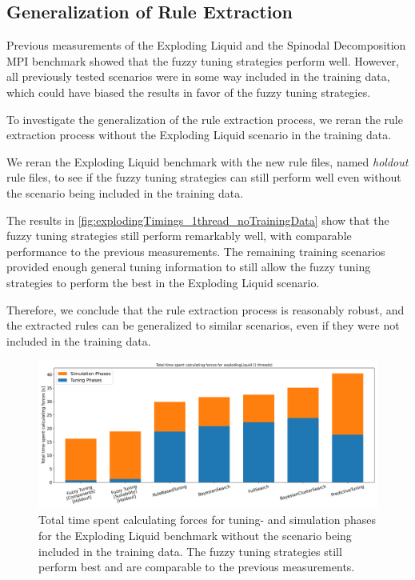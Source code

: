\newpage

\subsection{Generalization of Rule Extraction}

Previous measurements of the Exploding Liquid and the Spinodal Decomposition MPI benchmark showed that the fuzzy tuning strategies perform well. However, all previously tested scenarios were in some way included in the training data, which could have biased the results in favor of the fuzzy tuning strategies.

To investigate the generalization of the rule extraction process, we reran the rule extraction process without the Exploding Liquid scenario in the training data.

We reran the Exploding Liquid benchmark with the new rule files, named \emph{holdout} rule files, to see if the fuzzy tuning strategies can still perform well even without the scenario being included in the training data.

The results in \autoref{fig:explodingTimings_1thread_noTrainingData} show that the fuzzy tuning strategies still perform remarkably well, with comparable performance to the previous measurements. The remaining training scenarios provided enough general tuning information to still allow the fuzzy tuning strategies to perform the best in the Exploding Liquid scenario.

Therefore, we conclude that the rule extraction process is reasonably robust, and the extracted rules can be generalized to similar scenarios, even if they were not included in the training data.

\begin{figure}[H]
    \centering
    \includegraphics[width=\columnwidth,trim={0cm 0 0cm 0.9cm},clip]{figures/Benchmark/ExplodingLiquidHoldout/total_time_explodingLiquid_1.png}
    \caption[
        Benchmark Results for the Exploding Liquid Scenario (Holdout)
    ]{
        Total time spent calculating forces for tuning- and simulation phases for the Exploding Liquid benchmark without the scenario being included in the training data. The fuzzy tuning strategies still perform best and are comparable to the previous measurements.
    }
    \label{fig:explodingTimings_1thread_noTrainingData}
\end{figure}